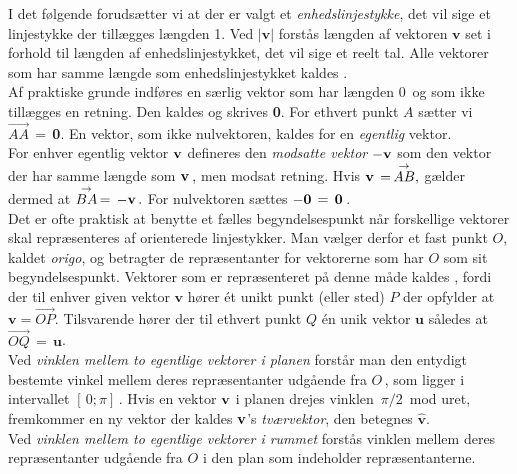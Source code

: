 I det følgende forudsætter vi at der er valgt et \textit{enhedslinjestykke}, det vil sige et linjestykke der tillægges længden 1. Ved $|\mathbf v|$ forstås længden af vektoren $\mathbf v$ set i forhold til længden af enhedslinjestykket, det vil sige et reelt tal. Alle vektorer som har samme længde som enhedslinjestykket kaldes .\\

Af praktiske grunde indføres en særlig vektor som har længden $0\,$ og som ikke tillægges en retning. Den kaldes  og skrives \textbf{0}. For ethvert punkt $A$ sætter vi $\stackrel{\rightarrow}{AA}\,=\,$\textbf{0}. En vektor, som ikke nulvektoren, kaldes for en \textit{egentlig} vektor.\\

For enhver egentlig vektor $\mathbf{v}$ defineres den \textit{modsatte vektor} $-\mathbf{v}$ som den vektor der har samme længde som $\mathbf{v}\,$, men modsat retning. Hvis $\mathbf{v}\,=\,\stackrel{\rightarrow}{AB},$ gælder dermed at  $\stackrel{\rightarrow}{BA}\,=\,-\mathbf{v}\,.$ For nulvektoren sættes $-\bm{0}\,=\,\bm{0}\,$.\\   

Det er ofte praktisk at benytte et fælles begyndelsespunkt når forskellige vektorer skal repræsenteres af orienterede linjestykker. Man vælger derfor et fast punkt $O$, kaldet \textit{origo}, og betragter de repræsentanter for vektorerne som har $O$ som sit begyndelsespunkt. Vektorer som er repræsenteret på denne måde kaldes , fordi der til enhver given vektor $\mathbf{v}$ hører ét unikt punkt (eller sted) $P$ der opfylder at 
$\mathbf{v}=\stackrel{\rightarrow}{OP}$. Tilsvarende hører der til ethvert punkt $Q$ én unik vektor $\mathbf u$ således at $\stackrel{\rightarrow}{OQ}\,=\,\mathbf{u}$.\\

Ved \textit{vinklen mellem to egentlige vektorer i planen} forstår man den entydigt bestemte vinkel mellem deres repræsentanter udgående fra $O\,$, som ligger i intervallet $\left[\,0;\pi\right]\,$. Hvis en vektor $\mathbf{v}$ i planen drejes vinklen $\,\pi /2\,$ mod uret, fremkommer en ny vektor der kaldes $\mathbf{v}$'s \textit{tværvektor}, den betegnes $\widehat{\mathbf{v}}$.\\

Ved \textit{vinklen mellem to egentlige vektorer i rummet} forstås vinklen  mellem deres repræsentanter udgående fra $O$ i den plan som indeholder repræsentanterne.\\

